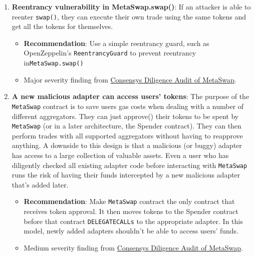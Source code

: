 \begin{enumerate}
\item\textbf{Reentrancy vulnerability in MetaSwap.swap()}: If an attacker is able to reenter \verb|swap()|, they can execute their own trade using the same tokens and get all the tokens for themselves.
	\begin{itemize}
	\item\textbf{Recommendation}: Use a simple reentrancy guard, such as OpenZeppelin’s \verb|ReentrancyGuard| to prevent reentrancy in\linebreak\verb|MetaSwap.swap()|
	\item Major severity finding from \href{https://consensys.net/diligence/audits/2020/08/metaswap/\#reentrancy-vulnerability-in-metaswap-swap}{Consensys Diligence Audit of MetaSwap}.
	\end{itemize}

\item\textbf{A new malicious adapter can access users’ tokens}: The purpose of the \verb|MetaSwap| contract is to save users gas costs when dealing with a number of different aggregators. They can just approve() their tokens to be spent by \verb|MetaSwap| (or in a later architecture, the Spender contract). They can then perform trades with all supported aggregators without having to reapprove anything. A downside to this design is that a malicious (or buggy) adapter has access to a large collection of valuable assets. Even a user who has diligently checked all existing adapter code before interacting with \verb|MetaSwap| runs the risk of having their funds intercepted by a new malicious adapter that’s added later.
	\begin{itemize}
	\item\textbf{Recommendation}: Make \verb|MetaSwap| contract the only contract that receives token approval. It then moves tokens to the Spender contract before that contract \verb|DELEGATECALLs| to the appropriate adapter. In this model, newly added adapters shouldn’t be able to access users’ funds.
	\item Medium severity finding from \href{https://consensys.net/diligence/audits/2020/08/metaswap/\#a-new-malicious-adapter-can-access-users-tokens}{Consensys Diligence Audit of MetaSwap}.
	\end{itemize}


\end{enumerate}
